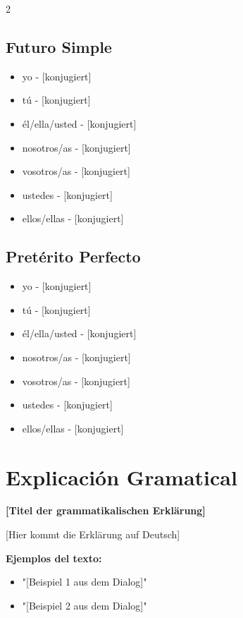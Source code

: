 \documentclass[12pt,a4paper]{article}
\begin{document}
\begin{multicols}{2}
\columnbreak

\subsection*{Futuro Simple}
\begin{itemize}[leftmargin=*]
    \item yo - [konjugiert]
    \item tú - [konjugiert]
    \item él/ella/usted - [konjugiert]
    \item nosotros/as - [konjugiert]
    \item vosotros/as - [konjugiert]
    \item ustedes - [konjugiert]
    \item ellos/ellas - [konjugiert]
\end{itemize}

\subsection*{Pretérito Perfecto}
\begin{itemize}[leftmargin=*]
    \item yo - [konjugiert]
    \item tú - [konjugiert]
    \item él/ella/usted - [konjugiert]
    \item nosotros/as - [konjugiert]
    \item vosotros/as - [konjugiert]
    \item ustedes - [konjugiert]
    \item ellos/ellas - [konjugiert]
\end{itemize}

\end{multicols}

\newpage

\section*{Explicación Gramatical}

\textbf{[Titel der grammatikalischen Erklärung]}

[Hier kommt die Erklärung auf Deutsch]

\textbf{Ejemplos del texto:}
\begin{itemize}[leftmargin=*]
    \item "[Beispiel 1 aus dem Dialog]"
    \item "[Beispiel 2 aus dem Dialog]"
\end{itemize}
\end{document}
